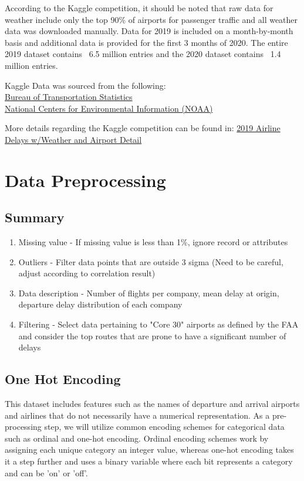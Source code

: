 \documentclass{article}
\begin{document}
According to the Kaggle competition, it should be noted that raw data for weather include only the top 90\%  of airports for passenger traffic and all weather data was downloaded manually. Data for 2019 is included on a month-by-month basis and additional data is provided for the first 3 months of 2020. The entire 2019 dataset contains ~6.5 million entries and the 2020 dataset contains ~1.4 million entries.

Kaggle Data was sourced from the following:\\
\href{https://www.transtats.bts.gov/databases.asp?Z1qr_VQ=E&Z1qr_Qr5p=N8vn6v10&f7owrp6_VQF=D}{Bureau of Transportation Statistics}\\
\href{https://www.ncdc.noaa.gov/cdo-web/datasets}{National Centers for Environmental Information (NOAA)}

More details regarding the Kaggle competition can be found in: \href{https://www.kaggle.com/threnjen/2019-airline-delays-and-cancellations?select=raw_data_documentation.txt}{2019 Airline Delays w/Weather and Airport Detail}


\section{Data Preprocessing}
\label{datapreprocessing}

\subsection{Summary}
\begin{enumerate}
\itemsep0em
\item Missing value - If missing value is less than 1\%, ignore record or attributes
\item Outliers - Filter data points that are outside 3 sigma (Need to be careful, adjust according to correlation result)
\item Data description - Number of flights per company, mean delay at origin, departure delay distribution of each company
\item Filtering - Select data pertaining to "Core 30" airports as defined by the FAA and consider the top routes that are prone to have a significant number of delays
\end{enumerate}

\subsection{One Hot Encoding}
This dataset includes features such as the names of departure and arrival airports and airlines that do not necessarily have a numerical representation. As a pre-processing step, we will utilize common encoding schemes for categorical data such as ordinal and one-hot encoding. Ordinal encoding schemes work by assigning each unique category an integer value, whereas one-hot encoding takes it a step further and uses a binary variable where each bit represents a category and can be 'on' or 'off'.
\end{document}
